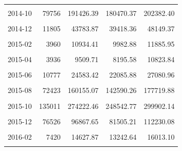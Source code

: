 \begin{longtable}[t]{crrrr}
\cellcolor{gray!10}{2014-09} & \cellcolor{gray!10}{84087} & \cellcolor{gray!10}{221360.89} & \cellcolor{gray!10}{196610.40} & \cellcolor{gray!10}{246111.38}\\
2014-10 & 79756 & 191426.39 & 180470.37 & 202382.40\\
\cellcolor{gray!10}{2014-11} & \cellcolor{gray!10}{19109} & \cellcolor{gray!10}{73565.06} & \cellcolor{gray!10}{64774.58} & \cellcolor{gray!10}{82355.53}\\
2014-12 & 11805 & 43783.87 & 39418.36 & 48149.37\\
\cellcolor{gray!10}{2015-01} & \cellcolor{gray!10}{7028} & \cellcolor{gray!10}{18950.61} & \cellcolor{gray!10}{16474.16} & \cellcolor{gray!10}{21427.06}\\
2015-02 & 3960 & 10934.41 & 9982.88 & 11885.95\\
\cellcolor{gray!10}{2015-03} & \cellcolor{gray!10}{2659} & \cellcolor{gray!10}{9167.08} & \cellcolor{gray!10}{7666.92} & \cellcolor{gray!10}{10667.23}\\
2015-04 & 3936 & 9509.71 & 8195.58 & 10823.84\\
\cellcolor{gray!10}{2015-05} & \cellcolor{gray!10}{3468} & \cellcolor{gray!10}{9884.60} & \cellcolor{gray!10}{7481.45} & \cellcolor{gray!10}{12287.74}\\
2015-06 & 10777 & 24583.42 & 22085.88 & 27080.96\\
\cellcolor{gray!10}{2015-07} & \cellcolor{gray!10}{15874} & \cellcolor{gray!10}{37538.40} & \cellcolor{gray!10}{31863.18} & \cellcolor{gray!10}{43213.63}\\
2015-08 & 72423 & 160155.07 & 142590.26 & 177719.88\\
\cellcolor{gray!10}{2015-09} & \cellcolor{gray!10}{137635} & \cellcolor{gray!10}{275943.03} & \cellcolor{gray!10}{256662.50} & \cellcolor{gray!10}{295223.56}\\
2015-10 & 135011 & 274222.46 & 248542.77 & 299902.14\\
\cellcolor{gray!10}{2015-11} & \cellcolor{gray!10}{77664} & \cellcolor{gray!10}{140893.15} & \cellcolor{gray!10}{122797.80} & \cellcolor{gray!10}{158988.51}\\
2015-12 & 76526 & 96867.65 & 81505.21 & 112230.08\\
\cellcolor{gray!10}{2016-01} & \cellcolor{gray!10}{20977} & \cellcolor{gray!10}{33237.27} & \cellcolor{gray!10}{25035.67} & \cellcolor{gray!10}{41438.88}\\
2016-02 & 7420 & 14627.87 & 13242.64 & 16013.10\\
\cellcolor{gray!10}{2016-03} & \cellcolor{gray!10}{12019} & \cellcolor{gray!10}{15357.83} & \cellcolor{gray!10}{13624.66} & \cellcolor{gray!10}{17090.99}\\

\end{longtable}

